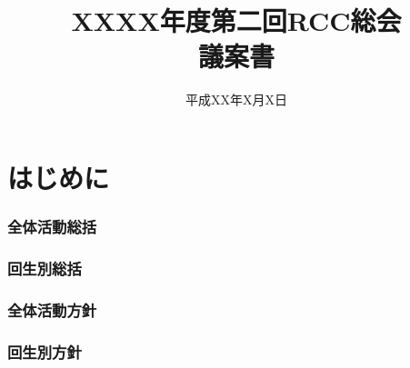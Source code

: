 \documentclass[a4j,titlepage]{jarticle}
\title{{\Huge XXXX年度第二回RCC総会\\議案書}}
\date{平成XX年X月X日}
\begin{document}
\maketitle
\tableofcontents

\newpage
\part*{はじめに}


\newpage
\section{全体活動総括}

\section{回生別総括}


\newpage
\section{全体活動方針}

\section{回生別方針}


\newpage

\end{document}

